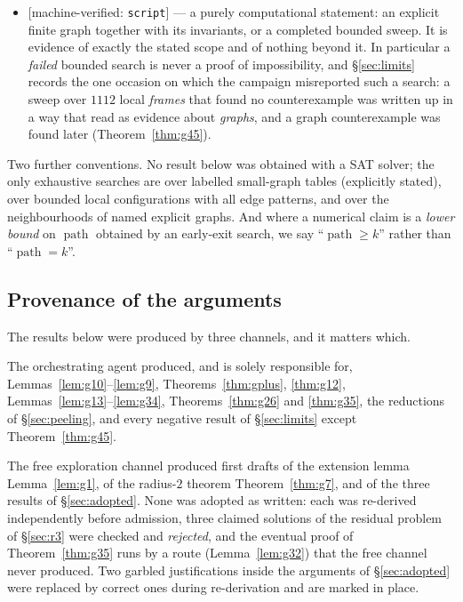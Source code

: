 \documentclass[11pt]{article}
\theoremstyle{plain}
\theoremstyle{definition}
\theoremstyle{remark}
\numberwithin{equation}{section}
\newcommand{\pth}{\operatorname{path}}
\newcommand{\statusbox}[1]{{\small\sloppy\textsf{[#1]}}}
\newcommand{\MV}[1]{\statusbox{machine-verified: \texttt{#1}}}
\begin{document}
\begin{itemize}
\item \MV{script} --- a purely computational statement: an explicit finite graph together
with its invariants, or a completed bounded sweep. It is evidence of exactly the stated scope
and of nothing beyond it. In particular a \emph{failed} bounded search is never a proof of
impossibility, and \S\ref{sec:limits} records the one occasion on which the campaign
misreported such a search: a sweep over $1112$ local \emph{frames} that found no
counterexample was written up in a way that read as evidence about \emph{graphs}, and a graph
counterexample was found later (Theorem~\ref{thm:g45}).
\end{itemize}

Two further conventions. No result below was obtained with a SAT solver; the only exhaustive
searches are over labelled small-graph tables (explicitly stated), over bounded local
configurations with all edge patterns, and over the neighbourhoods of named explicit graphs.
And where a numerical claim is a \emph{lower bound} on $\pth$ obtained by an early-exit
search, we say ``$\pth \ge k$'' rather than ``$\pth = k$''.

\subsection{Provenance of the arguments}\label{sec:provenance}

The results below were produced by three channels, and it matters which.

The orchestrating agent produced, and is solely responsible for,
Lemmas~\ref{lem:g10}--\ref{lem:g9}, Theorems~\ref{thm:gplus}, \ref{thm:g12},
Lemmas~\ref{lem:g13}--\ref{lem:g34}, Theorems~\ref{thm:g26} and \ref{thm:g35}, the
reductions of \S\ref{sec:peeling}, and every negative result of \S\ref{sec:limits} except
Theorem~\ref{thm:g45}.

The free exploration channel produced first drafts of the extension lemma
Lemma~\ref{lem:g1}, of the radius-$2$ theorem Theorem~\ref{thm:g7}, and of the three results
of \S\ref{sec:adopted}. None was adopted as written: each was re-derived independently before
admission, three claimed solutions of the residual problem of \S\ref{sec:r3} were checked and
\emph{rejected}, and the eventual proof of Theorem~\ref{thm:g35} runs by a route
(Lemma~\ref{lem:g32}) that the free channel never produced. Two garbled justifications inside
the arguments of \S\ref{sec:adopted} were replaced by correct ones during re-derivation and
are marked in place.
\end{document}
